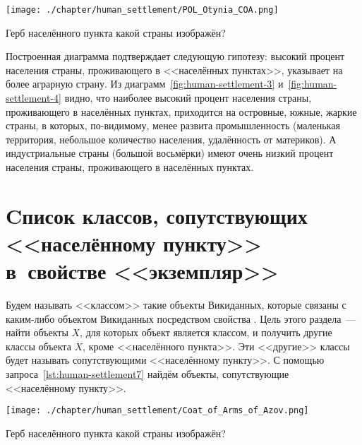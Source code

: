 \begin{marginfigure}[0.0cm]
{\texttt{[image: ./chapter/human\_settlement/POL\_Otynia\_COA.png]}}
  \caption{Герб населённого пункта какой страны изображён?}%
  \label{fig:flag_question_human_settlements4}%
\end{marginfigure}

Построенная диаграмма подтверждает следующую гипотезу: 
высокий процент населения страны, проживающего в <<населённых пунктах>>, 
указывает на более аграрную страну. 
Из диаграмм~\ref{fig:human-settlement-3} и~\ref{fig:human-settlement-4} видно, 
что наиболее высокий процент населения страны, проживающего в населённых пунктах, 
приходится на островные, южные, жаркие страны, 
в которых, по-видимому, менее развита промышленность 
(маленькая территория, небольшое количество населения, удалённость от материков). 
А индустриальные страны (большой восьмёрки) имеют очень низкий процент населения страны, 
проживающего в населённых пунктах.



\section{Cписок классов, сопутствующих <<населённому пункту>> в~свойстве <<экземпляр>>}
\label{human-settlement:tag1}

Будем называть <<классом>> такие объекты Викиданных, 
которые связаны с каким-либо объектом Викиданных посредством свойства . 
Цель этого раздела~--- найти объекты $X$, 
для которых объект  является классом, 
и получить другие классы объекта $X$, кроме <<населённого пункта>>. 
Эти <<другие>> классы будет называть сопутствующими <<населённому пункту>>. 
С помощью запроса~\ref{lst:human-settlement7} 
найдём объекты, сопутствующие <<населённому пункту>>. 


\begin{marginfigure}[-1.0cm]
{\texttt{[image: ./chapter/human\_settlement/Coat\_of\_Arms\_of\_Azov.png]}}
  \caption{Герб населённого пункта какой страны изображён?}%
  \label{fig:flag_question_human_settlements5}%
\end{marginfigure}

